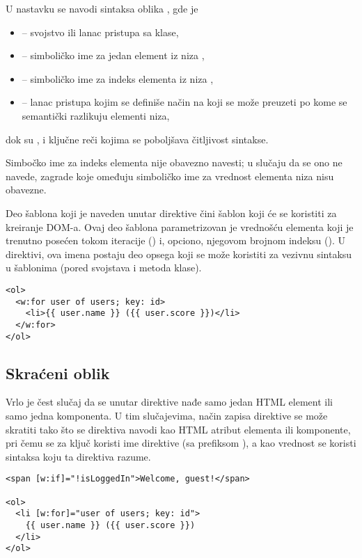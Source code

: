 U nastavku se navodi sintaksa oblika , gde je

\begin{itemize}
\item {} -- svojstvo ili lanac pristupa sa klase,
\item {} -- simboličko ime za jedan element iz niza ,
\item {} -- simboličko ime za indeks elementa  iz niza ,
\item {} -- lanac pristupa kojim se definiše način na koji se može preuzeti  po kome se semantički razlikuju elementi niza,
\end{itemize}

dok su , \code{;} i  ključne reči kojima se poboljšava čitljivost sintakse.

Simbočko ime za indeks elementa nije obavezno navesti; u slučaju da se ono ne navede, zagrade koje omeđuju simboličko ime za vrednost elementa niza nisu obavezne.

Deo šablona koji je naveden unutar direktive čini šablon koji će se koristiti za kreiranje DOM-a.
Ovaj deo šablona parametrizovan je vrednošću elementa koji je trenutno posećen tokom iteracije () i, opciono, njegovom brojnom indeksu ().
U direktivi, ova imena postaju deo opsega koji se može koristiti za vezivnu sintaksu u šablonima (pored svojstava i metoda klase).

\begin{verbatim}
<ol>
  <w:for user of users; key: id>
    <li>{{ user.name }} ({{ user.score }})</li>
  </w:for>
</ol>
\end{verbatim}

\subsection{Skraćeni oblik}

Vrlo je čest slučaj da se unutar direktive nađe samo jedan HTML element ili samo jedna komponenta.
U tim slučajevima, način zapisa direktive se može skratiti tako što se direktiva navodi kao HTML atribut elementa ili komponente, pri čemu se za ključ koristi ime direktive (sa prefiksom ), a kao vrednost se koristi sintaksa koju ta direktiva razume.

\begin{verbatim}
<span [w:if]="!isLoggedIn">Welcome, guest!</span>

<ol>
  <li [w:for]="user of users; key: id">
    {{ user.name }} ({{ user.score }})
  </li>
</ol>
\end{verbatim}

